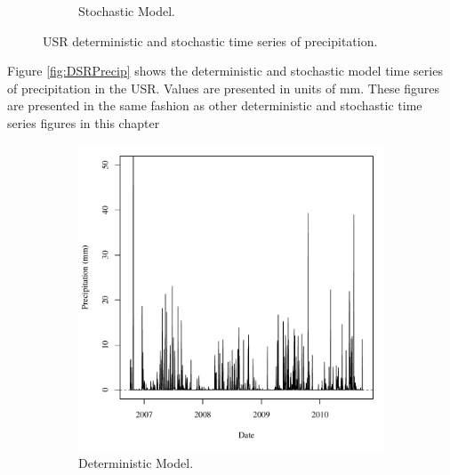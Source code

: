 \begin{linenumbers}
\begin{figure}[htbp]
\begin{subfigure}{0.5\textwidth}
		\caption{Stochastic Model.}
		\label{sub:USRPrecipS}
	\end{subfigure}
	\caption[USR deterministic and stochastic time series of precipitation.]{USR deterministic and stochastic time series of precipitation.}
	\label{fig:USRPrecip}
\end{figure}

Figure \ref{fig:DSRPrecip} shows the deterministic and stochastic model time series of precipitation in the USR.  Values are presented in units of mm.  These figures are presented in the same fashion as other deterministic and stochastic time series figures in this chapter

\begin{figure}[htbp]
\centering
	\begin{subfigure}{0.5\textwidth}
		\includegraphics[width=0.9\linewidth]{"Figures/Results_DDSR/A Precip"}
		\caption{Deterministic Model.}
		\label{sub:DSRPrecipD}
	\end{subfigure}%
	\begin{subfigure}{0.5\textwidth}

\end{subfigure}
\end{figure}
\end{linenumbers}
